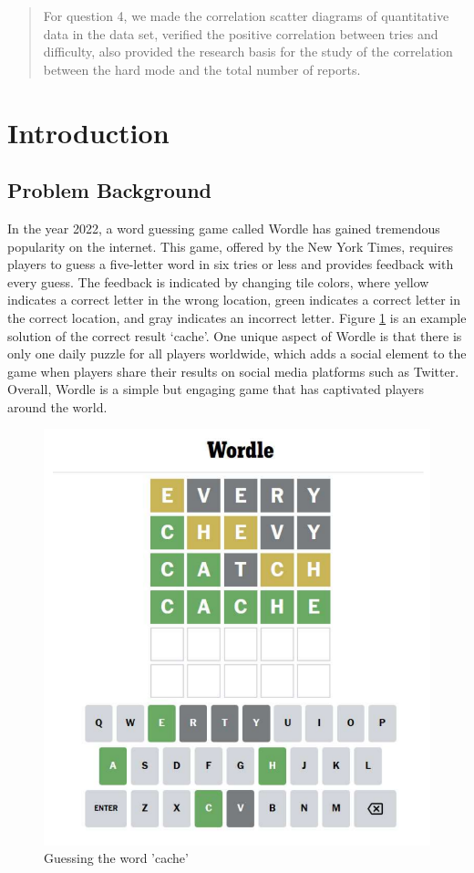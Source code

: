 \documentclass[
  journal=medium,
  manuscript=Report,
  year=2023,
  volume=37,
]{cup-journal}
\begin{document}
\begin{abstract}
    For question 4, we made the correlation scatter diagrams of quantitative data in the data set, verified the positive correlation between tries and difficulty, also provided the research basis for the study of the correlation between the hard mode and the total number of reports. 

\end{abstract}

\section{Introduction}

\subsection{Problem Background}

In the year 2022, a word guessing game called Wordle has gained tremendous popularity on the internet. This game, offered by the New York Times, requires players to guess a five-letter word in six tries or less and provides feedback with every guess. The feedback is indicated by changing tile colors, where yellow indicates a correct letter in the wrong location, green indicates a correct letter in the correct location, and gray indicates an incorrect letter. Figure \ref{word} is an example solution of the correct result ‘cache’. One unique aspect of Wordle is that there is only one daily puzzle for all players worldwide, which adds a social element to the game when players share their results on social media platforms such as Twitter. Overall, Wordle is a simple but engaging game that has captivated players around the world. 

\begin{figure}[hbt!]
    \centering
    \includegraphics[width=0.6\linewidth]{pic/cache.png}
    \caption{Guessing the word ’cache’ }
    \label{word}
\end{figure}
\end{document}
